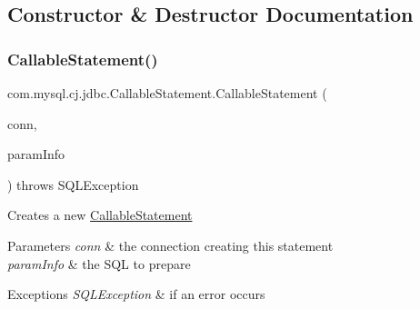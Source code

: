 \subsection{Constructor \& Destructor Documentation}
\mbox{\label{classcom_1_1mysql_1_1cj_1_1jdbc_1_1_callable_statement_aedac79a513af12d5af9a38c06593ae77}} 
\subsubsection{\texorpdfstring{Callable\+Statement()}{CallableStatement()}\hspace{0.1cm}{\footnotesize\ttfamily [1/2]}}
{\footnotesize\ttfamily com.\+mysql.\+cj.\+jdbc.\+Callable\+Statement.\+Callable\+Statement (\begin{DoxyParamCaption}\item[{\mbox{\hyperlink{interfacecom_1_1mysql_1_1cj_1_1jdbc_1_1_jdbc_connection}{Jdbc\+Connection}}}]{conn,  }\item[{\mbox{\hyperlink{classcom_1_1mysql_1_1cj_1_1jdbc_1_1_callable_statement_1_1_callable_statement_param_info}{Callable\+Statement\+Param\+Info}}}]{param\+Info }\end{DoxyParamCaption}) throws S\+Q\+L\+Exception}

Creates a new \mbox{\hyperlink{classcom_1_1mysql_1_1cj_1_1jdbc_1_1_callable_statement}{Callable\+Statement}}


\begin{DoxyParams}{Parameters}
{\em conn} & the connection creating this statement \\
\hline
{\em param\+Info} & the S\+QL to prepare\\
\hline
\end{DoxyParams}

\begin{DoxyExceptions}{Exceptions}
{\em S\+Q\+L\+Exception} & if an error occurs \\
\hline
\end{DoxyExceptions}
\mbox{\label{classcom_1_1mysql_1_1cj_1_1jdbc_1_1_callable_statement_a87cbed70a05b60f543557c5158d65520}} 
